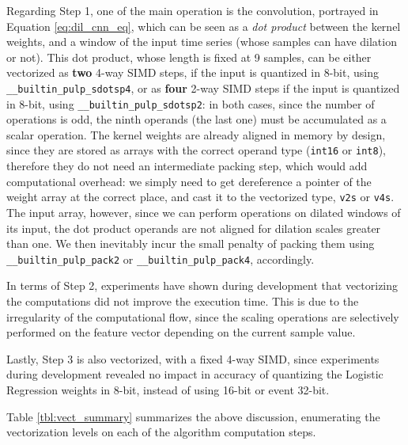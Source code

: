         Regarding Step 1, one of the main operation is the convolution, portrayed in Equation \ref{eq:dil_cnn_eq}, which can be seen as a \emph{dot product} between the kernel
        weights, and a window of the input time series (whose samples can have dilation or not). This dot product, whose length is fixed at 9 samples, can be either vectorized as 
        \textbf{two} 4-way SIMD steps, if the input is quantized in 8-bit, using \verb|__builtin_pulp_sdotsp4|, or as \textbf{four} 2-way SIMD steps if the input is quantized in 8-bit, 
        using \verb|__builtin_pulp_sdotsp2|: in both cases, since the number of operations is odd, the ninth operands (the last one) must be accumulated as a scalar operation.
        The kernel weights are already aligned in memory by design, since they are stored as arrays with the correct operand type (\verb|int16| or \verb|int8|), therefore they do not
        need an intermediate packing step, which would add computational overhead: we simply need to get dereference a pointer of the weight array at the correct place, and cast it to the
        vectorized type, \verb|v2s| or \verb|v4s|. The input array, however, since we can perform operations on dilated windows of its input, the dot product operands are not aligned
        for dilation scales greater than one. We then inevitably incur the small penalty of packing them using \verb|__builtin_pulp_pack2| or \verb|__builtin_pulp_pack4|, accordingly.

        In terms of Step 2, experiments have shown during development that vectorizing the computations did not improve the execution time. This is due to the irregularity of the computational
        flow, since the scaling operations are selectively performed on the feature vector depending on the current sample value.

        Lastly, Step 3 is also vectorized, with a fixed 4-way SIMD, since experiments during development revealed no impact in accuracy of quantizing the Logistic Regression weights in 8-bit,
        instead of using 16-bit or event 32-bit. 

        Table \ref{tbl:vect_summary} summarizes the above discussion, enumerating the vectorization levels on each of the algorithm computation steps.

